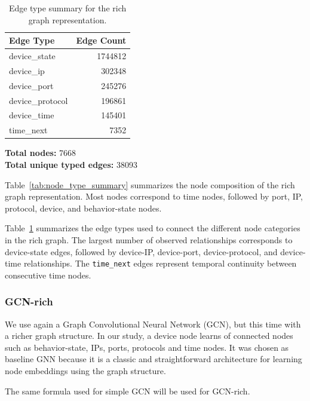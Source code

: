 \documentclass[final,5p,times,twocolumn]{elsarticle}
\begin{document}
\begin{table}[H]
\caption{Edge type summary for the rich graph representation.}
\centering
\small
\begin{tabular}{lr}
\toprule
\textbf{Edge Type} & \textbf{Edge Count} \\
\midrule
device\_state & 1744812 \\
device\_ip & 302348 \\
device\_port & 245276 \\
device\_protocol & 196861 \\
device\_time & 145401 \\
time\_next & 7352 \\
\bottomrule
\end{tabular}
\label{tab:edge_type_summary}
\end{table}

\begin{center}
\textbf{Total nodes:} 7668\\
\textbf{Total unique typed edges:} 38093
\end{center}

Table~\ref{tab:node_type_summary} summarizes the node composition of the rich graph representation. Most nodes correspond to time nodes, followed by port, IP, protocol, device, and behavior-state nodes.

Table~\ref{tab:edge_type_summary} summarizes the edge types used to connect the different node categories in the rich graph. The largest number of observed relationships corresponds to device-state edges, followed by device-IP, device-port, device-protocol, and device-time relationships. The \texttt{time\_next} edges represent temporal continuity between consecutive time nodes.








\begingroup
\color{red}
\subsubsection{GCN-rich}
We use again a Graph Convolutional Neural Network (GCN), but this time with a richer graph structure. In our study, a device node learns of connected nodes such as behavior-state, IPs, ports, protocols and time nodes. It was chosen as baseline GNN because it is a classic and straightforward architecture for learning node embeddings using the graph structure.

The same formula used for simple GCN will be used for GCN-rich.
\end{document}
